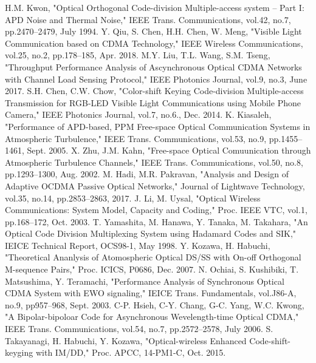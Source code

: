\begin{thebibliography}{99}
 H.M. Kwon, "Optical Orthogonal Code-division Multiple-access 
system -- Part I: APD Noise and Thermal Noise," IEEE Trans. Communications,
vol.42, no.7, pp.2470--2479, July 1994. 
%
 Y. Qiu, S. Chen, H.H. Chen, W. Meng, 
"Visible Light Communication based on CDMA Technology," IEEE Wireless Communications, 
vol.25, no.2, pp.178--185, Apr. 2018.
%
 M.Y. Liu, T.L. Wang, S.M. Tseng, 
"Throughput Performance Analysis of Ascynchronous Optical CDMA Networks 
with Channel Load Sensing Protocol," IEEE Photonics Journal, 
vol.9, no.3, June 2017.
%
 S.H. Chen, C.W. Chow, 
"Color-shift Keying Code-division Multiple-access Transmission for 
RGB-LED Visible Light Communications using Mobile Phone Camera," 
IEEE Photonics Journal, vol.7, no.6., Dec. 2014. 
%
 K. Kiasaleh, 
"Performance of APD-based, PPM Free-space Optical Communication Systems in Atmospheric Turbulence," 
IEEE Trans. Communications, vol.53, no.9, pp.1455--1461, Sept. 2005. 
%
 X. Zhu, J.M. Kahn, 
"Free-space Optical Comuunication through Atmospheric Turbulence Channels," 
IEEE Trans. Communications, vol.50, no.8, pp.1293--1300, Aug. 2002.
%
%
 M. Hadi, M.R. Pakravan, 
"Analysis and Design of Adaptive OCDMA Passive Optical Networks," 
Journal of Lightwave Technology, vol.35, no.14, pp.2853--2863, 2017. 
%
 J. Li, M. Uysal,  
"Optical Wireless Communications: System Model, Capacity and Coding," 
Proc. IEEE VTC, vol.1, pp.168--172, Oct. 2003. 
%
 T. Yamashita, M. Hanawa, Y. Tanaka, M. Takahara, 
"An Optical Code Division Multiplexing System using Hadamard Codes and SIK," 
IEICE Technical Report, OCS98-1, May 1998. 
%
 Y. Kozawa, H. Habuchi, 
"Theoretical Ananlysis of Atomospheric Optical DS/SS with On-off Orthogonal 
M-sequence Pairs," Proc. ICICS, P0686, Dec. 2007. 
%
 N. Ochiai, S. Kushibiki, T. Matsushima, Y. Teramachi, 
"Performance Analysis of Synchronous Optical CDMA System with EWO signaling," 
IEICE Trans. Fundamentals, vol.J86-A, no.9, pp957--968, Sept. 2003. 
%
%
 C-P. Hsieh, C-Y. Chang, G-C. Yang, W.C. Kwong, 
"A Bipolar-bipoloar Code for Asynchronous Wevelength-time Optical CDMA," 
IEEE Trans. Communications, vol.54, no.7, pp.2572--2578, July 2006. 
%
 S. Takayanagi, H. Habuchi, Y. Kozawa, 
"Optical-wireless Enhanced Code-shift-keyging with IM/DD," 
Proc. APCC, 14-PM1-C, Oct. 2015.
\end{thebibliography}

